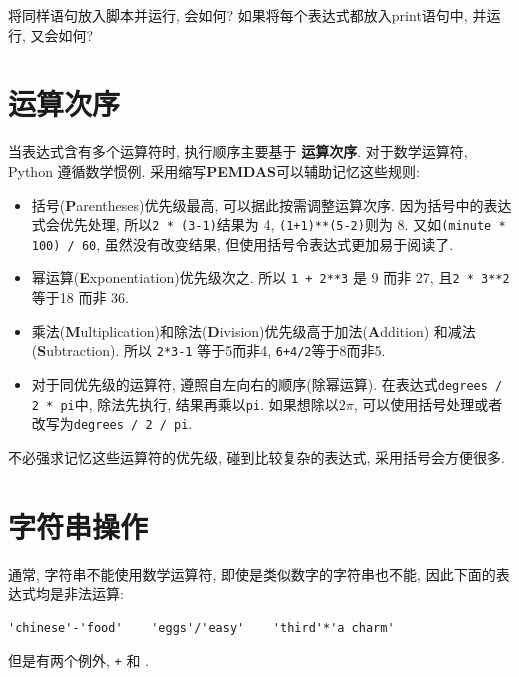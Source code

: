\documentclass[10pt]{book}
\begin{document}
将同样语句放入脚本并运行, 会如何?
如果将每个表达式都放入print语句中, 并运行, 又会如何?


\section{运算次序}

当表达式含有多个运算符时, 执行顺序主要基于 {\bf 运算次序}. 
对于数学运算符, Python 遵循数学惯例. 
采用缩写{\bf PEMDAS}可以辅助记忆这些规则:

\begin{itemize}

\item 括号({\bf P}arentheses)优先级最高, 可以据此按需调整运算次序. 
因为括号中的表达式会优先处理, 所以{\tt 2 * (3-1)}结果为 4, {\tt (1+1)**(5-2)}则为 8. 
又如{\tt (minute * 100) / 60}, 
虽然没有改变结果, 但使用括号令表达式更加易于阅读了. 

\item 幂运算({\bf E}xponentiation)优先级次之. 所以
{\tt 1 + 2**3} 是 9 而非 27,  且{\tt 2 * 3**2} 等于18 而非 36. 

\item 乘法({\bf M}ultiplication)和除法({\bf D}ivision)优先级高于加法({\bf A}ddition)
和减法({\bf S}ubtraction). 所以 {\tt 2*3-1} 等于5而非4, {\tt 6+4/2}等于8而非5. 

\item 对于同优先级的运算符, 遵照自左向右的顺序(除幂运算). 
 在表达式{\tt degrees / 2 * pi}中, 除法先执行, 结果再乘以{\tt pi}. 
如果想除以$2 \pi$,  可以使用括号处理或者改写为{\tt degrees / 2 / pi}. 

\end{itemize}

不必强求记忆这些运算符的优先级, 碰到比较复杂的表达式, 采用括号会方便很多. 


\section{字符串操作}

通常, 字符串不能使用数学运算符, 即使是类似数字的字符串也不能, 
因此下面的表达式均是非法运算:

\begin{verbatim}
'chinese'-'food'    'eggs'/'easy'    'third'*'a charm'
\end{verbatim}
%

但是有两个例外,  {\tt +} 和 {\tt *}. 
\end{document}
